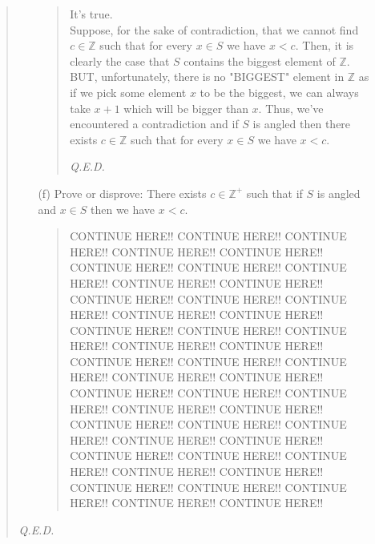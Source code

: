 \documentclass[12pt, a4paper]{article}                      %
\begin{document}
\begin{enumerate}
\begin{quote}
\begin{itemize}
\begin{quote}
It's true.\\
Suppose, for the sake of contradiction, that we cannot find $c \in \mathbb{Z}$ such that
for every $x \in S$ we have $x < c$. Then, it is clearly the case that $S$ contains
the biggest element of $\mathbb{Z}$. BUT, unfortunately, there is no "BIGGEST" element
in $\mathbb{Z}$ as if we pick some element $x$ to be the biggest, we can always take $x + 1$
which will be bigger than $x$. Thus, we've encountered a contradiction and if $S$ is angled then there exists $c \in \mathbb{Z}$ such that for every $x \in S$
we have $x < c$.
\begin{flushright}
\textit{Q.E.D.}
\end{flushright}
\end{quote}
\item[(f)]
Prove or disprove: There exists $c \in \mathbb{Z}^+$ such that
if $S$ is angled and $x \in S$ then we have $x < c$.
\begin{quote}
CONTINUE HERE!! CONTINUE HERE!! CONTINUE HERE!!
CONTINUE HERE!! CONTINUE HERE!! CONTINUE HERE!!
CONTINUE HERE!! CONTINUE HERE!! CONTINUE HERE!!
CONTINUE HERE!! CONTINUE HERE!! CONTINUE HERE!!
CONTINUE HERE!! CONTINUE HERE!! CONTINUE HERE!!
CONTINUE HERE!! CONTINUE HERE!! CONTINUE HERE!!
CONTINUE HERE!! CONTINUE HERE!! CONTINUE HERE!!
CONTINUE HERE!! CONTINUE HERE!! CONTINUE HERE!!
CONTINUE HERE!! CONTINUE HERE!! CONTINUE HERE!!
CONTINUE HERE!! CONTINUE HERE!! CONTINUE HERE!!
CONTINUE HERE!! CONTINUE HERE!! CONTINUE HERE!!
CONTINUE HERE!! CONTINUE HERE!! CONTINUE HERE!!
CONTINUE HERE!! CONTINUE HERE!! CONTINUE HERE!!
CONTINUE HERE!! CONTINUE HERE!! CONTINUE HERE!!
CONTINUE HERE!! CONTINUE HERE!! CONTINUE HERE!!
\end{quote}
\end{itemize}
\begin{flushright}
\textit{Q.E.D.}
\end{flushright}
\end{quote}


\end{enumerate}
\end{document}
